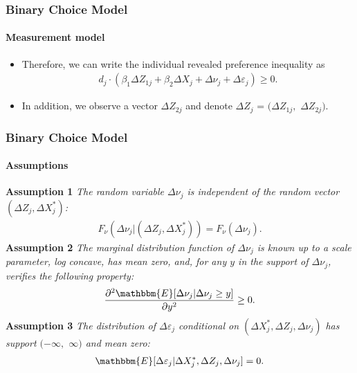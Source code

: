 \begin{frame}
\frametitle{Binary Choice Model}
\framesubtitle{Measurement model}

\begin{itemize}
	\item Therefore, we can write the individual revealed preference inequality as
	\begin{align*}
	d_{j} \cdot (\beta_{1}\Delta Z_{1j}+\beta_{2}\Delta X_{j}+\Delta\nu_{j}+\Delta\varepsilon_{j})\geq 0.
	\end{align*}
	\item In addition, we observe a vector $\Delta Z_{2j}$ and denote $\Delta Z_{j}$ = $(\Delta Z_{1j},$ $\Delta Z_{2j})$.
\end{itemize}
\end{frame}
\begin{frame}
\frametitle{Binary Choice Model}
\framesubtitle{Assumptions}

\textbf{Assumption 1} \textit{The random variable $\Delta\nu_{j}$ is independent of the random vector $(\Delta Z_{j},\Delta X^{*}_{j})$: 
\begin{align*}
F_{\nu}(\Delta\nu_{j}|(\Delta Z_{j},\Delta X^{*}_{j}))=F_{\nu}(\Delta\nu_{j}).
\end{align*}}
\textbf{Assumption 2} \textit{The marginal distribution function of $\Delta\nu_{j}$ is known up to a scale parameter, log concave, has mean zero, and, for any $y$ in the support of $\Delta\nu_{j}$, verifies the following property:
\begin{align*}
\frac{\partial^{2}\mathbbm{E}[\Delta\nu_{j}|\Delta\nu_{j}\geq y]}{\partial y^{2}}\geq 0.
\end{align*}}
\textbf{Assumption 3} \textit{The distribution of $\Delta\varepsilon_{j}$ conditional on $(\Delta X^{*}_{j},\Delta Z_{j},\Delta \nu_{j})$ has support $(-\infty,$ $\infty)$ and mean zero:
\begin{align*}
\mathbbm{E}[\Delta\varepsilon_{j}|\Delta X^{*}_{j},\Delta Z_{j},\Delta\nu_{j}]=0.
\end{align*}}
\end{frame}

